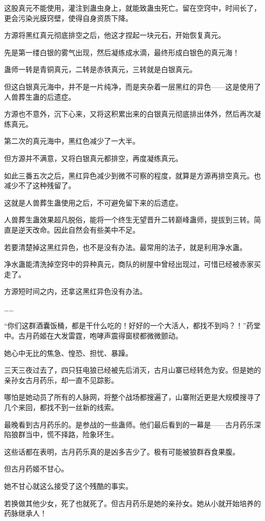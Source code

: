 \begin{this_body}
这股真元不能使用，灌注到蛊虫身上，就能致蛊虫死亡。留在空窍中，时间长了，更会污染光膜窍壁，使得自身资质下降。

方源将黑红真元彻底排空之后，他这才捏起一块元石，开始恢复真元。

先是第一缕白银的雾气出现，然后凝练成水滴，最终形成白银色的真元海！

蛊师一转是青铜真元，二转是赤铁真元，三转就是白银真元。

但这白银真元海中，并不是一片纯净，而是夹杂着一层黑红的异色——这是使用了人兽葬生蛊的后遗症。

方源也不意外，沉下心来，又将这积累出来的白银真元彻底排出体外，然后再次凝练真元。

第二次的真元海中，黑红色减少了一大半。

但方源并不满意，又将白银真元都排空，再度凝练真元。

如此三番五次之后，黑红异色减少到微不可察的程度，就算是方源再排空真元。也减少不了这种残留了。

这就是人兽葬生蛊使用之后，不可避免留下来的后遗症。

人兽葬生蛊效果超凡脱俗，能将一个终生无望晋升二转巅峰蛊师，提拔到三转。简直是逆天改命。因此自然会有些美中不足。

若要清楚掉这黑红异色，也不是没有办法。最常用的法子，就是利用净水蛊。

净水蛊能清洗掉空窍中的异种真元，商队的树屋中曾经出现过，可惜已经被赤家买走了。

方源短时间之内，还拿这黑红异色没有办法。

……

“你们这群酒囊饭桶，都是干什么吃的！好好的一个大活人，都找不到吗？！”药堂中。古月药姬在大发雷霆，咆哮声震得窗棂都微微颤动。

她心中无比的焦急、惶恐、担忧、暴躁。

三天三夜过去了，四只狂电狼已经被先后消灭，古月山寨已经转危为安。但是她的亲孙女古月药乐，却一直不见踪影。

哪怕是她动员了所有的人脉网，将整个战场都搜遍了，山寨附近更是大规模搜寻了几个来回，都找不到一丝新的线索。

最晚看到古月药乐的。是参战的一些蛊师。他们最后看到的一幕是——古月药乐深陷狼群当中，慌不择路，险象环生。

这些话都在表明，古月药乐真的是凶多吉少了。极有可能被狼群吞食果腹。

但古月药姬不甘心。

她不甘心就这么接受了这个残酷的事实。

若换做其他少女，死了也就死了。但古月药乐是她的亲孙女。她从小就开始培养的药脉继承人！


\end{this_body}
